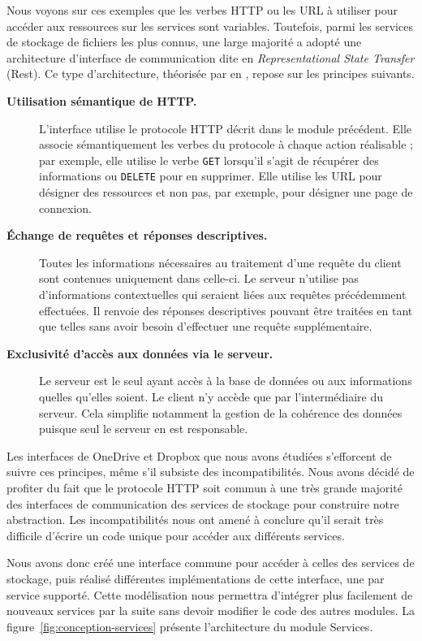 Nous voyons sur ces exemples que les verbes HTTP ou les URL à utiliser pour accéder aux ressources sur les services sont variables.
Toutefois, parmi les services de stockage de fichiers les plus connus, une large majorité a adopté une architecture d'interface de communication dite en \emph{Representational State Transfer} (Rest). Ce type d'architecture, théorisée par \citeauthor{fielding2000} en \citeyear{fielding2000}, repose sur les principes suivants.

\begin{description}
    \item[\textbf{Utilisation sémantique de HTTP.}] L'interface utilise le protocole HTTP décrit dans le module précédent. Elle associe sémantiquement les verbes du protocole à chaque action réalisable ; par exemple, elle utilise le verbe \texttt{GET} lorsqu'il s'agit de récupérer des informations ou \texttt{DELETE} pour en supprimer. Elle utilise les URL pour désigner des ressources et non pas, par exemple, pour désigner une page de connexion.

    \item[\textbf{Échange de requêtes et réponses descriptives.}] Toutes les informations nécessaires au traitement d'une requête du client sont contenues uniquement dans celle-ci. Le serveur n'utilise pas d'informations contextuelles qui seraient liées aux requêtes précédemment effectuées. Il renvoie des réponses descriptives pouvant être traitées en tant que telles sans avoir besoin d'effectuer une requête supplémentaire.

    \item[\textbf{Exclusivité d'accès aux données via le serveur.}] Le serveur est le seul ayant accès à la base de données ou aux informations quelles qu'elles soient. Le client n'y accède que par l'intermédiaire du serveur. Cela simplifie notamment la gestion de la cohérence des données puisque seul le serveur en est responsable.
\end{description}

Les interfaces de OneDrive et Dropbox que nous avons étudiées s'efforcent de suivre ces principes, même s'il subsiste des incompatibilités. Nous avons décidé de profiter du fait que le protocole HTTP soit commun à une très grande majorité des interfaces de communication des services de stockage pour construire notre abstraction. Les incompatibilités nous ont amené à conclure qu'il serait très difficile d'écrire un code unique pour accéder aux différents services.

Nous avons donc créé une interface commune pour accéder à celles des services de stockage, puis réalisé différentes implémentations de cette interface, une par service supporté. Cette modélisation nous permettra d'intégrer plus facilement de nouveaux services par la suite sans devoir modifier le code des autres modules. La figure~\ref{fig:conception-services} présente l'architecture du module Services.

